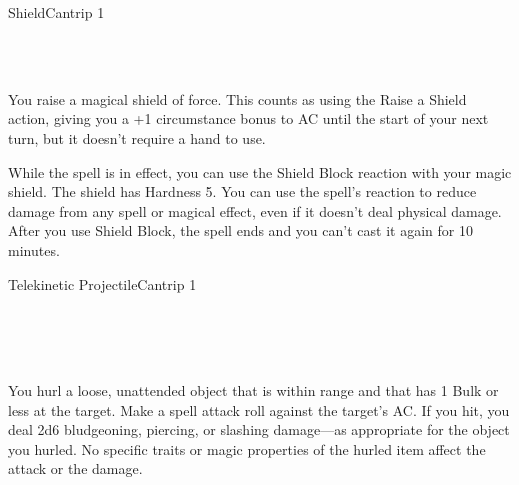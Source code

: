 \documentclass[12pt,openany,twocolumn]{book}
\begin{document}
\begin{spell}{Shield}{}{Cantrip 1}
    \begin{spellinfo}
         \\
         \\
    \end{spellinfo}

    \begin{spellbody}
        You raise a magical shield of force. This counts as using the Raise a Shield action, giving you a +1 circumstance bonus to AC until the start of your next turn, but it doesn't require a hand to use.

        While the spell is in effect, you can use the Shield Block reaction with your magic shield. The shield has Hardness 5. You can use the spell's reaction to reduce damage from any spell or magical effect, even if it doesn't deal physical damage. After you use Shield Block, the spell ends and you can't cast it again for 10 minutes.
    \end{spellbody}


\end{spell}

\begin{spell}{Telekinetic Projectile}{}{Cantrip 1}
    \begin{spellinfo}
         \\
         \\
         \\
    \end{spellinfo}

    \begin{spellbody}
        You hurl a loose, unattended object that is within range and that has 1 Bulk or less at the target. Make a spell attack roll against the target's AC. If you hit, you deal 2d6 bludgeoning, piercing, or slashing damage—as appropriate for the object you hurled. No specific traits or magic properties of the hurled item affect the attack or the damage.


    \end{spellbody}


\end{spell}
\end{document}
